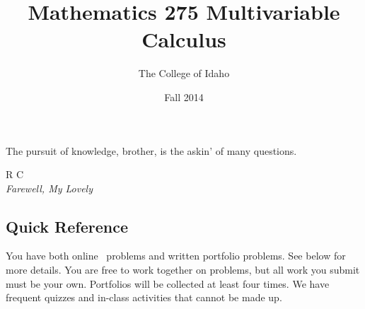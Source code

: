 \documentclass[symmetric]{tufte-handout}
\title{Mathematics 275 Multivariable Calculus}
\date{Fall 2014}
\author{The College of Idaho}
\begin{document}
\maketitle
\begin{fullwidth}
\epigraph{%
    The pursuit of knowledge, brother, is the askin' of many questions.%
}{R C \\ \emph{Farewell, My Lovely}}
\end{fullwidth}

\subsection{Quick Reference} \label{ssec:quickreference}
    \begin{minipage}[t]{0.40\linewidth}
        \vspace{0pt}
        You have both online \webwork\ problems and written portfolio
        problems. See below for more details.
        You are free to work together on problems, but all work
        you submit must be your own. Portfolios will be collected
        at least four times. We have frequent quizzes and in-class
        activities that cannot be made up.
    \end{minipage} \hspace{1em}
\end{document}
